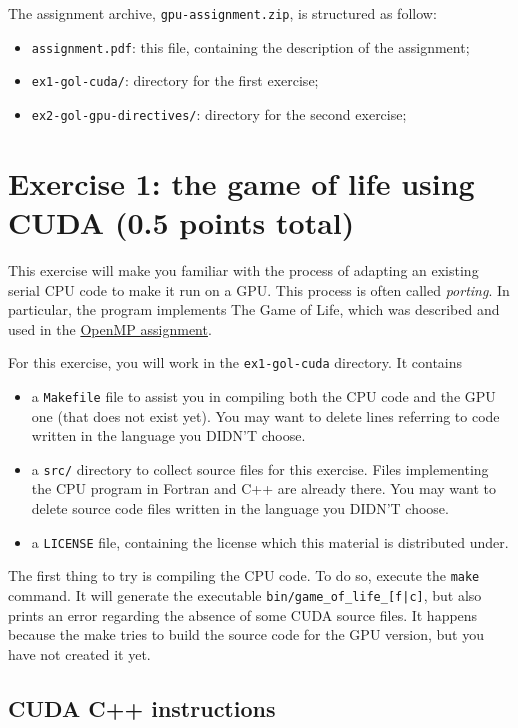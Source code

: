 \documentclass[a4paper, 11pt]{article}
\begin{document}
	The assignment archive, \texttt{gpu-assignment.zip}, is structured as follow:
	
	\begin{itemize}
		\item \texttt{assignment.pdf}: this file, containing the description of the assignment;
		\item \texttt{ex1-gol-cuda/}: directory for the first exercise;
		\item \texttt{ex2-gol-gpu-directives/}: directory for the second exercise;
	\end{itemize}


	\section{Exercise 1: the game of life using CUDA (0.5 points total)}
	
	This exercise will make you familiar with the process of adapting an existing serial CPU code to make it run on a GPU. This process is often called \textit{porting}. In particular, the program implements The Game of Life, which was described and used in the \href{https://internal.pawsey.org.au/share/s/Cc3Tm7DDR_Srd2YjUrTusw}{OpenMP assignment}.
	
	For this exercise, you will work in the \texttt{ex1-gol-cuda} directory. It contains 
	\begin{itemize}
		\item a \texttt{Makefile} file to assist you in compiling both the CPU code and the GPU one (that does not exist yet). You may want to delete lines referring to code written in the language you DIDN'T choose.
		\item a \texttt{src/} directory to collect source files for this exercise. Files implementing the CPU program in Fortran and C++ are already there. You may want to delete source code files written in the language you DIDN'T choose.
		\item a \texttt{LICENSE} file, containing the license which this material is distributed under.
	\end{itemize}
	
	The first thing to try is compiling the CPU code. To do so, execute the \texttt{make} command. It will generate the executable \texttt{bin/game\_of\_life\_[f|c]}, but also prints an error regarding the absence of some CUDA source files. It happens because the make tries to build the source code for the GPU version, but you have not created it yet.
	
	\subsection{CUDA C++ instructions}
	
\end{document}
